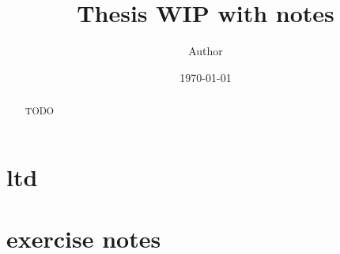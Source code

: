 \documentclass{article}
\numberwithin{equation}{section}
\numberwithin{algorithm}{section}
\begin{document}

\title{Thesis WIP with notes}
\author{Author}
\date{\today}
\maketitle

\clearpage

\begin{abstract}
TODO
\end{abstract}
\clearpage

\setcounter{tocdepth}{2}
\tableofcontents

\clearpage
\section{ltd}

\section{exercise notes}
\end{document}
